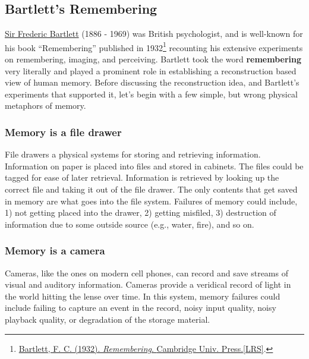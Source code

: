 \documentclass[
  oneside,
  12pt]{crumpbook}
\begin{document}
\hypertarget{bartletts-remembering}{%
\subsection{Bartlett's Remembering}\label{bartletts-remembering}}

\href{https://en.wikipedia.org/wiki/Frederic_Bartlett}{Sir Frederic Bartlett} (1886 - 1969) was British psychologist, and is well-known for his book ``Remembering'' published in 1932\footnote{\protect\hyperlink{ref-bartlettRemembering1932}{Bartlett, F. C. (1932). \emph{Remembering}. {Cambridge Univ. Press.{[}LRS{]}}}.} recounting his extensive experiments on remembering, imaging, and perceiving. Bartlett took the word \textbf{remembering} very literally and played a prominent role in establishing a reconstruction based view of human memory. Before discussing the reconstruction idea, and Bartlett's experiments that supported it, let's begin with a few simple, but wrong physical metaphors of memory.

\hypertarget{memory-is-a-file-drawer}{%
\subsubsection{Memory is a file drawer}\label{memory-is-a-file-drawer}}

File drawers a physical systems for storing and retrieving information. Information on paper is placed into files and stored in cabinets. The files could be tagged for ease of later retrieval. Information is retrieved by looking up the correct file and taking it out of the file drawer. The only contents that get saved in memory are what goes into the file system. Failures of memory could include, 1) not getting placed into the drawer, 2) getting misfiled, 3) destruction of information due to some outside source (e.g., water, fire), and so on.

\hypertarget{memory-is-a-camera}{%
\subsubsection{Memory is a camera}\label{memory-is-a-camera}}

Cameras, like the ones on modern cell phones, can record and save streams of visual and auditory information. Cameras provide a veridical record of light in the world hitting the lense over time. In this system, memory failures could include failing to capture an event in the record, noisy input quality, noisy playback quality, or degradation of the storage material.
\end{document}
